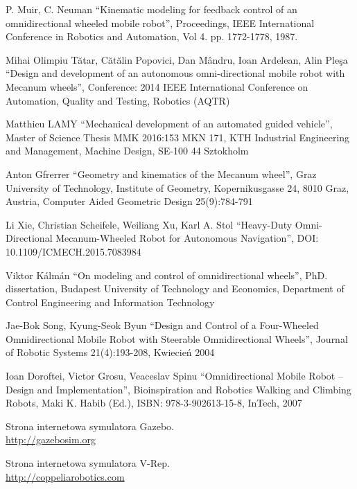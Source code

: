 \begin{thebibliography}{0}

P. Muir, C. Neuman ``Kinematic modeling for feedback control of an omnidirectional wheeled mobile robot'', 
Proceedings, IEEE International Conference in Robotics and Automation, 
Vol 4. pp. 1772-1778, 1987.

Mihai Olimpiu Tătar, Cătălin Popovici, Dan Mândru, Ioan Ardelean, Alin Pleşa ``Design and development of an autonomous omni-directional mobile robot with Mecanum wheels'',
Conference: 2014 IEEE International Conference on Automation, Quality and Testing, Robotics (AQTR)

Matthieu LAMY ``Mechanical development of an automated guided vehicle'',
Master of Science Thesis MMK 2016:153 MKN 171,
KTH Industrial Engineering and Management,
Machine Design,
SE-100 44 Sztokholm

Anton Gfrerrer ``Geometry and kinematics of the Mecanum wheel'',
Graz University of Technology, Institute of Geometry, Kopernikusgasse 24, 8010 Graz, Austria,
Computer Aided Geometric Design 25(9):784-791

Li Xie, Christian Scheifele, Weiliang Xu, Karl A. Stol ``Heavy-Duty Omni-Directional Mecanum-Wheeled Robot for Autonomous Navigation'',
DOI: 10.1109/ICMECH.2015.7083984

Viktor Kálmán ``On modeling and control of omnidirectional wheels'',
PhD. dissertation, Budapest University of Technology and Economics,
Department of Control Engineering and Information Technology

Jae-Bok Song, Kyung-Seok Byun
``Design and Control of a Four-Wheeled Omnidirectional Mobile Robot with Steerable Omnidirectional Wheels'',
Journal of Robotic Systems 21(4):193-208, Kwiecień 2004

Ioan Doroftei, Victor Grosu, Veaceslav Spinu
``Omnidirectional Mobile Robot – Design and Implementation'',
Bioinspiration and Robotics Walking and Climbing Robots, Maki K. Habib (Ed.), ISBN: 978-3-902613-15-8, InTech,
2007

Strona internetowa symulatora Gazebo. \\
\url{http://gazebosim.org}

Strona internetowa symulatora V-Rep. \\
\url{http://coppeliarobotics.com}


\end{thebibliography}
